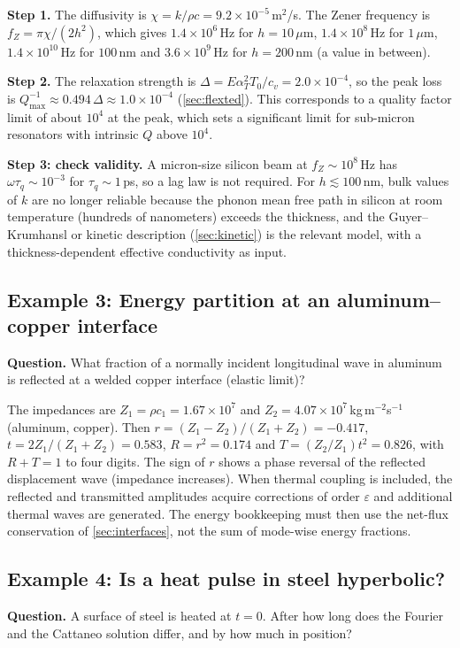 \textbf{Step 1.} The diffusivity is $\chi=k/\rho c=9.2\times10^{-5}$\,m$^2$/s. The Zener frequency is $f_Z=\pi\chi/(2h^2)$, which gives $1.4\times10^{6}$\,Hz for $h=10\,\mu$m, $1.4\times10^{8}$\,Hz for $1\,\mu$m, $1.4\times10^{10}$\,Hz for $100$\,nm and $3.6\times10^{9}$\,Hz for $h=200$\,nm (a value in between).

\textbf{Step 2.} The relaxation strength is $\Delta=E\alpha_T^2T_0/c_v=2.0\times10^{-4}$, so the peak loss is $Q^{-1}_{\max}\approx0.494\,\Delta\approx1.0\times10^{-4}$ (\cref{sec:flexted}). This corresponds to a quality factor limit of about $10^{4}$ at the peak, which sets a significant limit for sub-micron resonators with intrinsic $Q$ above $10^{4}$.

\textbf{Step 3: check validity.} A micron-size silicon beam at $f_Z\sim10^{8}$\,Hz has $\omega\tau_q\sim10^{-3}$ for $\tau_q\sim1$\,ps, so a lag law is not required. For $h\lesssim100$\,nm, bulk values of $k$ are no longer reliable because the phonon mean free path in silicon at room temperature (hundreds of nanometers) exceeds the thickness, and the Guyer--Krumhansl or kinetic description (\cref{sec:kinetic}) is the relevant model, with a thickness-dependent effective conductivity as input.

\subsection{Example 3: Energy partition at an aluminum--copper interface}
\textbf{Question.} What fraction of a normally incident longitudinal wave in aluminum is reflected at a welded copper interface (elastic limit)?

The impedances are $Z_1=\rho c_1=1.67\times10^{7}$ and $Z_2=4.07\times10^{7}$\,kg\,m$^{-2}$s$^{-1}$ (aluminum, copper). Then $r=(Z_1-Z_2)/(Z_1+Z_2)=-0.417$, $t=2Z_1/(Z_1+Z_2)=0.583$, $R=r^2=0.174$ and $T=(Z_2/Z_1)t^2=0.826$, with $R+T=1$ to four digits. The sign of $r$ shows a phase reversal of the reflected displacement wave (impedance increases). When thermal coupling is included, the reflected and transmitted amplitudes acquire corrections of order $\varepsilon$ and additional thermal waves are generated. The energy bookkeeping must then use the net-flux conservation of \cref{sec:interfaces}, not the sum of mode-wise energy fractions.

\subsection{Example 4: Is a heat pulse in steel hyperbolic?}
\textbf{Question.} A surface of steel is heated at $t=0$. After how long does the Fourier and the Cattaneo solution differ, and by how much in position?

